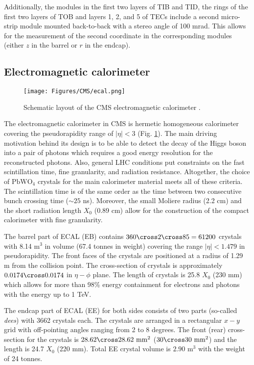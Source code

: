 Additionally, the modules in the first two layers of TIB and TID, the rings of the first two layers of TOB and layers 1, 2, and 5 of TECs include a second micro-strip module mounted back-to-back with a stereo angle of 100 mrad. This allows for the measurement of the second coordinate in the corresponding modules (either $z$ in the barrel or $r$ in the endcap).


\subsection{Electromagnetic calorimeter}\label{sec:ecal}

\begin{figure}[h!]
    \centering
    \texttt{[image: Figures/CMS/ecal.png]}
    \caption{Schematic layout of the CMS electromagnetic calorimeter \cite{CMS:2008xjf}.}
    \label{fig:ecal}
\end{figure}

The electromagnetic calorimeter in CMS is hermetic homogeneous calorimeter covering the pseudorapidity range of $|\eta|<3$ (Fig. \ref{fig:ecal}). The main driving motivation behind its design is to be able to detect the decay of the Higgs boson into a pair of photons which requires a good energy resolution for the reconstructed photons. Also, general LHC conditions put constraints on the fast scintillation time, fine granularity, and radiation resistance. Altogether, the choice of $\text{PbWO}_4$ crystals for the main calorimeter material meets all of these criteria. The scintillation time is of the same order as the time between two consecutive bunch crossing time ($\sim 25$ ns). Moreover, the small Moliere radius (2.2 cm) and the short radiation length $X_0$ (0.89 cm) allow for the construction of the compact calorimeter with fine granularity.

The barrel part of ECAL (EB) contains $360 \cross 2 \cross 85 = 61200$ crystals with 8.14 $\text{m}^3$ in volume (67.4 tonnes in weight) covering the range $|\eta| < 1.479$ in pseudorapidity. The front faces of the crystals are positioned at a radius of 1.29 m from the collision point. The cross-section of crystals is approximately $0.0174 \cross 0.0174$ in $\eta-\phi$ plane. The length of crystals is 25.8 $X_0$ (230 mm) which allows for more than 98\% energy containment for electrons and photons with the energy up to 1 TeV. 

The endcap part of ECAL (EE) for both sides consists of two parts (so-called \textit{dees}) with 3662 crystals each. The crystals are arranged in a rectangular $x-y$ grid with off-pointing angles ranging from 2 to 8 degrees. The front (rear) cross-section for the crystals is $28.62 \cross 28.62 \text{ mm}^2$ ($30 \cross 30 \text{ mm}^2$) and the length is 24.7 $X_0$ (220 mm). Total EE crystal volume is $2.90 \text{ m}^3$ with the weight of 24 tonnes.  

